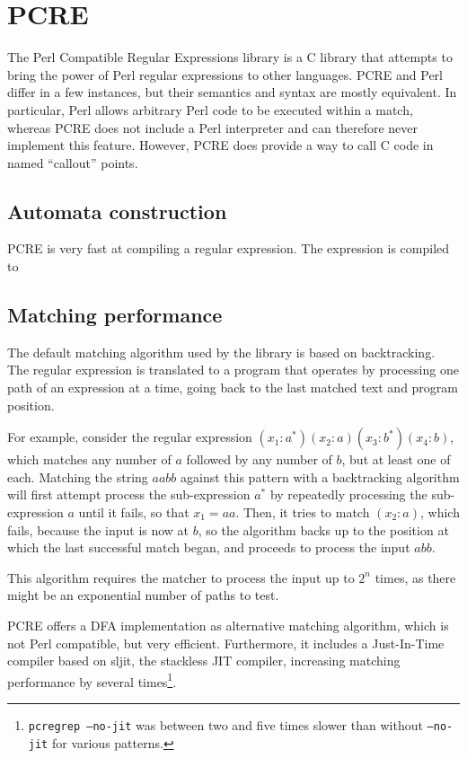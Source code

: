 \section{PCRE}

The Perl Compatible Regular Expressions library is a C library that attempts to
bring the power of Perl regular expressions to other languages. PCRE and Perl
differ in a few instances, but their semantics and syntax are mostly equivalent.
In particular, Perl allows arbitrary Perl code to be executed within a match,
whereas PCRE does not include a Perl interpreter and can therefore never
implement this feature. However, PCRE does provide a way to call C code in named
``callout'' points.

\subsection{Automata construction}

PCRE is very fast at compiling a regular expression. The expression is compiled
to 


\subsection{Matching performance}

The default matching algorithm used by the library is based on backtracking. The
regular expression is translated to a program that operates by processing one
path of an expression at a time, going back to the last matched text and program
position.

For example, consider the regular expression $(x_1:a^*)(x_2:a)(x_3:b^*)(x_4:b)$,
which matches any number of $a$ followed by any number of $b$, but at least one
of each. Matching the string $aabb$ against this pattern with a backtracking
algorithm will first attempt process the sub-expression $a^*$ by repeatedly
processing the sub-expression $a$ until it fails, so that $x_1 = aa$. Then, it
tries to match $(x_2:a)$, which fails, because the input is now at $b$, so the
algorithm backs up to the position at which the last successful match began, and
proceeds to process the input $abb$.

This algorithm requires the matcher to process the input up to $2^n$ times, as
there might be an exponential number of paths to test.

PCRE offers a DFA implementation as alternative matching algorithm, which is not
Perl compatible, but very efficient. Furthermore, it includes a Just-In-Time
compiler based on sljit, the stackless JIT compiler, increasing matching
performance by several times\footnote{\texttt{pcregrep --no-jit} was between two
and five times slower than without \texttt{--no-jit} for various patterns.}.

